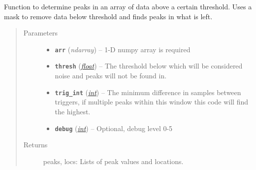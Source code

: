 \documentclass[a4paper,10pt,english]{sphinxmanual}
\begin{document}
\begin{fulllineitems}
\label{utils:findpeaks.find_peaks2_short}
Function to determine peaks in an array of data above a certain threshold.
Uses a mask to remove data below threshold and finds peaks in what is left.
\begin{quote}\begin{description}
\item[{Parameters}] \leavevmode\begin{itemize}
\item {} 
\textbf{\texttt{arr}} (\emph{ndarray}) -- 1-D numpy array is required

\item {} 
\textbf{\texttt{thresh}} (\href{https://docs.python.org/library/functions.html\#float}{\emph{float}}) -- The threshold below which will be considered noise and peaks    will not be found in.

\item {} 
\textbf{\texttt{trig\_int}} (\href{https://docs.python.org/library/functions.html\#int}{\emph{int}}) -- The minimum difference in samples between triggers,    if multiple peaks within this window this code will find the highest.

\item {} 
\textbf{\texttt{debug}} (\href{https://docs.python.org/library/functions.html\#int}{\emph{int}}) -- Optional, debug level 0-5

\end{itemize}

\item[{Returns}] \leavevmode
peaks, locs: Lists of peak values and locations.

\end{description}\end{quote}

\end{fulllineitems}

\end{document}
